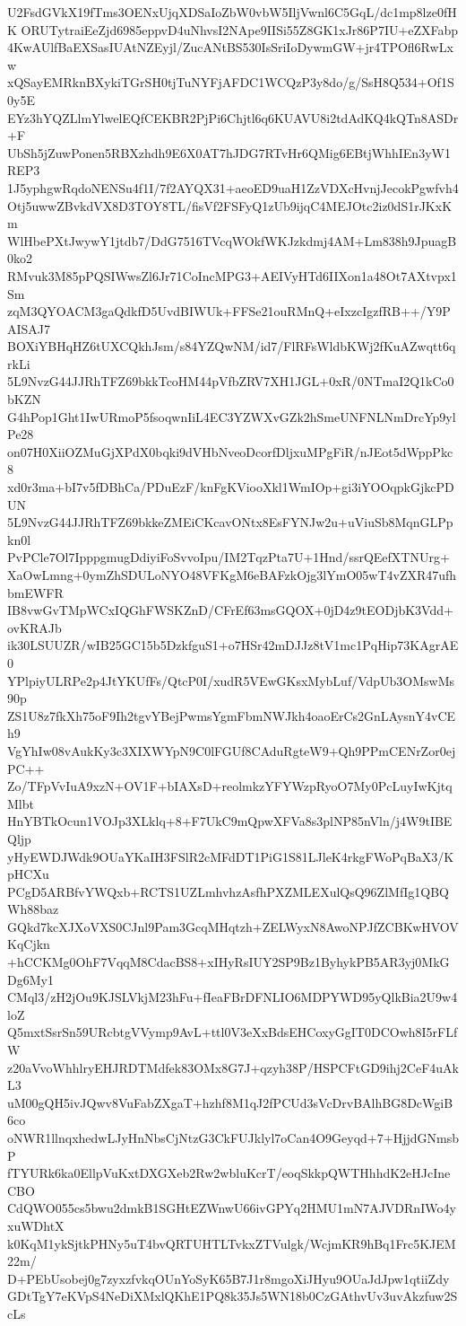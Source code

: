 U2FsdGVkX19fTms3OENxUjqXDSaIoZbW0vbW5IljVwnl6C5GqL/dc1mp8lze0fHK
ORUTytraiEeZjd6985eppvD4uNhvsI2NApe9IISi55Z8GK1xJr86P7IU+eZXFabp
4KwAUlfBaEXSasIUAtNZEyjl/ZucANtBS530IsSriIoDywmGW+jr4TPOfl6RwLxw
xQSayEMRknBXykiTGrSH0tjTuNYFjAFDC1WCQzP3y8do/g/SsH8Q534+Of1S0y5E
EYz3hYQZLlmYlwelEQfCEKBR2PjPi6Chjtl6q6KUAVU8i2tdAdKQ4kQTn8ASDr+F
UbSh5jZuwPonen5RBXzhdh9E6X0AT7hJDG7RTvHr6QMig6EBtjWhhIEn3yW1REP3
1J5yphgwRqdoNENSu4f1I/7f2AYQX31+aeoED9uaH1ZzVDXcHvnjJecokPgwfvh4
Otj5uwwZBvkdVX8D3TOY8TL/fisVf2FSFyQ1zUb9ijqC4MEJOtc2iz0dS1rJKxKm
WlHbePXtJwywY1jtdb7/DdG7516TVcqWOkfWKJzkdmj4AM+Lm838h9JpuagB0ko2
RMvuk3M85pPQSIWwsZl6Jr71CoIncMPG3+AEIVyHTd6IIXon1a48Ot7AXtvpx1Sm
zqM3QYOACM3gaQdkfD5UvdBIWUk+FFSe21ouRMnQ+eIxzcIgzfRB++/Y9PAISAJ7
BOXiYBHqHZ6tUXCQkhJsm/s84YZQwNM/id7/FlRFsWldbKWj2fKuAZwqtt6qrkLi
5L9NvzG44JJRhTFZ69bkkTcoHM44pVfbZRV7XH1JGL+0xR/0NTmaI2Q1kCo0bKZN
G4hPop1Ght1IwURmoP5fsoqwnIiL4EC3YZWXvGZk2hSmeUNFNLNmDrcYp9ylPe28
on07H0XiiOZMuGjXPdX0bqki9dVHbNveoDcorfDljxuMPgFiR/nJEot5dWppPkc8
xd0r3ma+bI7v5fDBhCa/PDuEzF/knFgKViooXkl1WmIOp+gi3iYOOqpkGjkcPDUN
5L9NvzG44JJRhTFZ69bkkeZMEiCKcavONtx8EsFYNJw2u+uViuSb8MqnGLPpkn0l
PvPCle7Ol7IpppgmugDdiyiFoSvvoIpu/IM2TqzPta7U+1Hnd/ssrQEefXTNUrg+
XaOwLmng+0ymZhSDULoNYO48VFKgM6eBAFzkOjg3lYmO05wT4vZXR47ufhbmEWFR
IB8vwGvTMpWCxIQGhFWSKZnD/CFrEf63msGQOX+0jD4z9tEODjbK3Vdd+ovKRAJb
ik30LSUUZR/wIB25GC15b5DzkfguS1+o7HSr42mDJJz8tV1mc1PqHip73KAgrAE0
YPlpiyULRPe2p4JtYKUfFs/QtcP0I/xudR5VEwGKsxMybLuf/VdpUb3OMswMs90p
ZS1U8z7fkXh75oF9Ih2tgvYBejPwmsYgmFbmNWJkh4oaoErCs2GnLAysnY4vCEh9
VgYhIw08vAukKy3c3XIXWYpN9C0lFGUf8CAduRgteW9+Qh9PPmCENrZor0ejPC++
Zo/TFpVvIuA9xzN+OV1F+bIAXsD+reolmkzYFYWzpRyoO7My0PcLuyIwKjtqMlbt
HnYBTkOcun1VOJp3XLklq+8+F7UkC9mQpwXFVa8s3plNP85nVln/j4W9tIBEQljp
yHyEWDJWdk9OUaYKaIH3FSlR2cMFdDT1PiG1S81LJleK4rkgFWoPqBaX3/KpHCXu
PCgD5ARBfvYWQxb+RCTS1UZLmhvhzAsfhPXZMLEXulQsQ96ZlMfIg1QBQWh88baz
GQkd7kcXJXoVXS0CJnl9Pam3GcqMHqtzh+ZELWyxN8AwoNPJfZCBKwHVOVKqCjkn
+hCCKMg0OhF7VqqM8CdacBS8+xIHyRsIUY2SP9Bz1ByhykPB5AR3yj0MkGDg6My1
CMql3/zH2jOu9KJSLVkjM23hFu+fIeaFBrDFNLIO6MDPYWD95yQlkBia2U9w4loZ
Q5mxtSsrSn59URcbtgVVymp9AvL+ttl0V3eXxBdsEHCoxyGgIT0DCOwh8I5rFLfW
z20aVvoWhhlryEHJRDTMdfek83OMx8G7J+qzyh38P/HSPCFtGD9ihj2CeF4uAkL3
uM00gQH5ivJQwv8VuFabZXgaT+hzhf8M1qJ2fPCUd3sVcDrvBAlhBG8DcWgiB6co
oNWR1llnqxhedwLJyHnNbsCjNtzG3CkFUJklyl7oCan4O9Geyqd+7+HjjdGNmsbP
fTYURk6ka0EllpVuKxtDXGXeb2Rw2wbluKcrT/eoqSkkpQWTHhhdK2eHJcIneCBO
CdQWO055cs5bwu2dmkB1SGHtEZWnwU66ivGPYq2HMU1mN7AJVDRnIWo4yxuWDhtX
k0KqM1ykSjtkPHNy5uT4bvQRTUHTLTvkxZTVulgk/WcjmKR9hBq1Frc5KJEM22m/
D+PEbUsobej0g7zyxzfvkqOUnYoSyK65B7J1r8mgoXiJHyu9OUaJdJpw1qtiiZdy
GDtTgY7eKVpS4NeDiXMxlQKhE1PQ8k35Js5WN18b0CzGAthvUv3uvAkzfuw2ScLs
